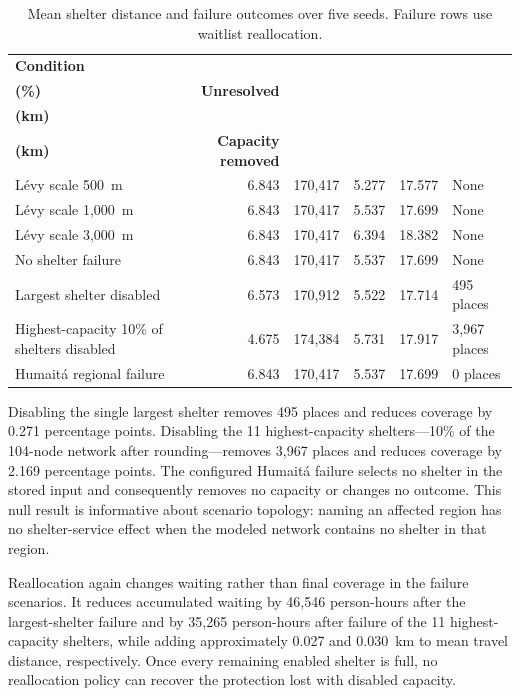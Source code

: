 \begin{table}[ht]
\centering
\footnotesize
\caption{Mean shelter distance and failure outcomes over five seeds. Failure rows use waitlist reallocation.}
\label{tbl:shelter_spatial_failures}
\begin{tabularx}{\linewidth}{@{}>{\raggedright\arraybackslash}Xrrrrl@{}}
\toprule
\textbf{Condition} &
\shortstack{\textbf{Coverage}\\\textbf{(\%)}} &
\textbf{Unresolved} &
\shortstack{\textbf{Mean distance}\\\textbf{(km)}} &
\shortstack{\textbf{P95 distance}\\\textbf{(km)}} &
\textbf{Capacity removed} \\
\midrule
L\'evy scale 500~m   & 6.843 & 170,417 & 5.277 & 17.577 & None \\
L\'evy scale 1,000~m & 6.843 & 170,417 & 5.537 & 17.699 & None \\
L\'evy scale 3,000~m & 6.843 & 170,417 & 6.394 & 18.382 & None \\
\addlinespace
No shelter failure        & 6.843 & 170,417 & 5.537 & 17.699 & None \\
Largest shelter disabled  & 6.573 & 170,912 & 5.522 & 17.714 & 495 places \\
Highest-capacity 10\% of shelters disabled & 4.675 & 174,384 & 5.731 & 17.917 & 3,967 places \\
Humait\'a regional failure & 6.843 & 170,417 & 5.537 & 17.699 & 0 places \\
\bottomrule
\end{tabularx}
\end{table}

Disabling the single largest shelter removes 495 places and reduces coverage by 0.271 percentage points. Disabling the 11 highest-capacity shelters---10\% of the 104-node network after rounding---removes 3,967 places and reduces coverage by 2.169 percentage points. The configured Humait\'a failure selects no shelter in the stored input and consequently removes no capacity or changes no outcome. This null result is informative about scenario topology: naming an affected region has no shelter-service effect when the modeled network contains no shelter in that region.

Reallocation again changes waiting rather than final coverage in the failure scenarios. It reduces accumulated waiting by 46,546 person-hours after the largest-shelter failure and by 35,265 person-hours after failure of the 11 highest-capacity shelters, while adding approximately 0.027 and 0.030~km to mean travel distance, respectively. Once every remaining enabled shelter is full, no reallocation policy can recover the protection lost with disabled capacity.

